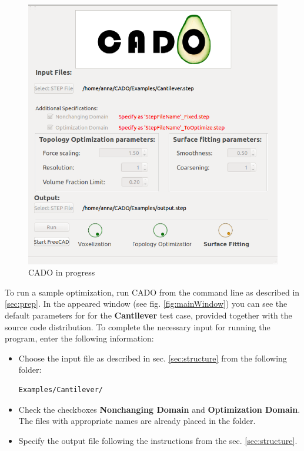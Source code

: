\documentclass[
12pt, %
a4paper, %
oneside, %
headinclude,footinclude, %
BCOR5mm, %
]{scrartcl}
\begin{document}
\begin{figure}
\centering
\includegraphics[scale=0.4]{Pictures/CADO_inProgress}
\caption{CADO in progress}
\label{fig:inProgress}
\end{figure}
To run a sample optimization, run CADO from the command line as described in \ref{sec:prep}. In the appeared window (see fig. \ref{fig:mainWindow}) you can see the default parameters for for the \textbf{Cantilever} test case, provided together with the source code distribution. To complete the necessary input for running the program, enter the following information:
\begin{itemize}
\item Choose the input file as described in sec. \ref{sec:structure} from the following folder:
\begin{lstlisting}[language = {Promela}]
Examples/Cantilever/
\end{lstlisting}
\item Check the checkboxes \textbf{Nonchanging Domain} and \textbf{Optimization Domain}. The files with appropriate names are already placed in the folder.
\item Specify the output file following the instructions from the sec. \ref{sec:structure}.
\end{itemize}
\end{document}
